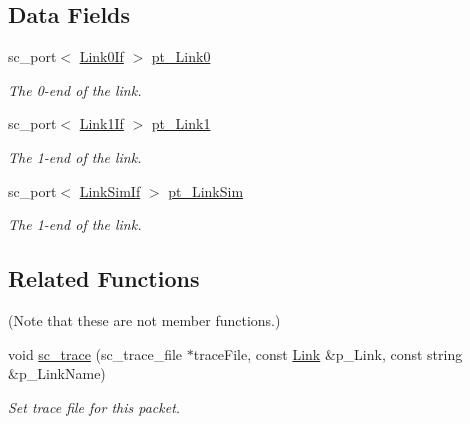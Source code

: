 \subsection*{Data Fields}
\begin{DoxyCompactItemize}
\item 
\hypertarget{classLink_a6dc662e66d2955d93b2097e3b76a293c}{sc\-\_\-port$<$ \hyperlink{classLink0If}{Link0\-If} $>$ \hyperlink{classLink_a6dc662e66d2955d93b2097e3b76a293c}{pt\-\_\-\-Link0}}\label{classLink_a6dc662e66d2955d93b2097e3b76a293c}

\begin{DoxyCompactList}\small\item\em The 0-\/end of the link. \end{DoxyCompactList}\item 
\hypertarget{classLink_a937ffa502e7eb0d15e26b8fe5d8fac59}{sc\-\_\-port$<$ \hyperlink{classLink1If}{Link1\-If} $>$ \hyperlink{classLink_a937ffa502e7eb0d15e26b8fe5d8fac59}{pt\-\_\-\-Link1}}\label{classLink_a937ffa502e7eb0d15e26b8fe5d8fac59}

\begin{DoxyCompactList}\small\item\em The 1-\/end of the link. \end{DoxyCompactList}\item 
\hypertarget{classLink_a135ddeaf0e024e2076edbe9ea1c6bc95}{sc\-\_\-port$<$ \hyperlink{classLinkSimIf}{Link\-Sim\-If} $>$ \hyperlink{classLink_a135ddeaf0e024e2076edbe9ea1c6bc95}{pt\-\_\-\-Link\-Sim}}\label{classLink_a135ddeaf0e024e2076edbe9ea1c6bc95}

\begin{DoxyCompactList}\small\item\em The 1-\/end of the link. \end{DoxyCompactList}\end{DoxyCompactItemize}
\subsection*{Related Functions}
(Note that these are not member functions.) \begin{DoxyCompactItemize}
\item 
void \hyperlink{classLink_aa7508ea81181860cc78972e60217e4d1}{sc\-\_\-trace} (sc\-\_\-trace\-\_\-file $\ast$trace\-File, const \hyperlink{classLink}{Link} \&p\-\_\-\-Link, const string \&p\-\_\-\-Link\-Name)
\begin{DoxyCompactList}\small\item\em Set trace file for this packet. \end{DoxyCompactList}\end{DoxyCompactItemize}


